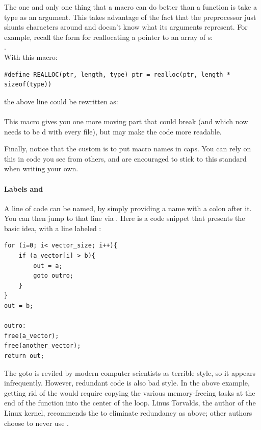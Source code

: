 \documentclass[12pt]{article}
\makeatletter
\def\cind#1{\index{#1@\cinline{#1}}\cinline{#1}}
\makeatother
\begin{document}
The one and only one thing that a macro can do better than a function is
take a type as an argument. This takes advantage of the fact that the preprocessor 
just shunts characters around and doesn't know what its arguments represent.
For example, recall the form for reallocating a pointer to an array of s:\\
.\\
With this macro:
\begin{lstlisting}
#define REALLOC(ptr, length, type) ptr = realloc(ptr, length * sizeof(type))
\end{lstlisting}
the above line could be rewritten as:\\
\\
This macro gives you one more moving part that could break (and which
now needs to be d with every file), but
may make the code more readable.

Finally, notice that the custom is to put macro names in caps.  You can
rely on this in code you see from others, and are encouraged to stick
to this standard when writing your own.

\paragraph{Labels and } A line of code can be named, by simply providing a
name with a colon after it. You can then jump to that line via \cind{goto}. Here is a code snippet that presents the basic idea, with a line labeled :
\begin{lstlisting}
for (i=0; i< vector_size; i++){
    if (a_vector[i] > b){
        out = a;
        goto outro;
    }
}
out = b;

outro:
free(a_vector);
free(another_vector);
return out;
\end{lstlisting}
The goto is reviled by modern computer scientists as terrible style, so
it appears infrequently. However, redundant code is also bad style. 
In the above example, getting rid of the  would require
copying the various memory-freeing
tasks at the end of the function into the center of the  loop.
Linus Torvalds, the author of the Linux kernel, recommends the  to eliminate redundancy as above; other authors choose to never use
.
\end{document}
